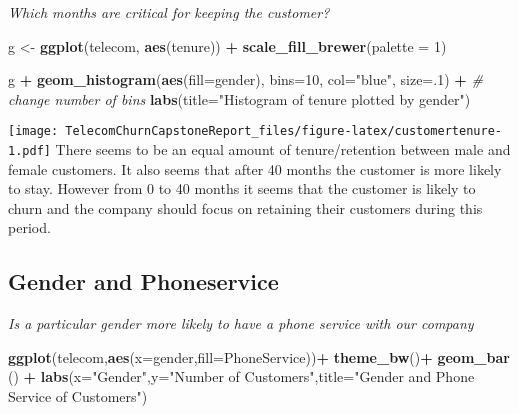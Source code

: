 \documentclass[]{article}
\newenvironment{Shaded}{\begin{snugshade}}{\end{snugshade}}
\newcommand{\KeywordTok}[1]{\textcolor[rgb]{0.13,0.29,0.53}{\textbf{#1}}}
\newcommand{\DataTypeTok}[1]{\textcolor[rgb]{0.13,0.29,0.53}{#1}}
\newcommand{\DecValTok}[1]{\textcolor[rgb]{0.00,0.00,0.81}{#1}}
\newcommand{\StringTok}[1]{\textcolor[rgb]{0.31,0.60,0.02}{#1}}
\newcommand{\CommentTok}[1]{\textcolor[rgb]{0.56,0.35,0.01}{\textit{#1}}}
\newcommand{\OperatorTok}[1]{\textcolor[rgb]{0.81,0.36,0.00}{\textbf{#1}}}
\newcommand{\NormalTok}[1]{#1}
\begin{document}
\emph{Which months are critical for keeping the customer?}

\begin{Shaded}
\begin{Highlighting}[]
\NormalTok{g <-}\StringTok{ }\KeywordTok{ggplot}\NormalTok{(telecom, }\KeywordTok{aes}\NormalTok{(tenure)) }\OperatorTok{+}\StringTok{ }\KeywordTok{scale_fill_brewer}\NormalTok{(}\DataTypeTok{palette =} \DecValTok{1}\NormalTok{)}


\NormalTok{g }\OperatorTok{+}\StringTok{ }\KeywordTok{geom_histogram}\NormalTok{(}\KeywordTok{aes}\NormalTok{(}\DataTypeTok{fill=}\NormalTok{gender), }
                   \DataTypeTok{bins=}\DecValTok{10}\NormalTok{, }
                   \DataTypeTok{col=}\StringTok{"blue"}\NormalTok{, }
                   \DataTypeTok{size=}\NormalTok{.}\DecValTok{1}\NormalTok{) }\OperatorTok{+}\StringTok{   }\CommentTok{# change number of bins}
\StringTok{  }\KeywordTok{labs}\NormalTok{(}\DataTypeTok{title=}\StringTok{"Histogram of tenure plotted by gender"}\NormalTok{) }
\end{Highlighting}
\end{Shaded}

\texttt{[image: TelecomChurnCapstoneReport\_files/figure-latex/customertenure-1.pdf]}
There seems to be an equal amount of tenure/retention between male and
female customers. It also seems that after 40 months the customer is
more likely to stay. However from 0 to 40 months it seems that the
customer is likely to churn and the company should focus on retaining
their customers during this period.

\subsection{Gender and Phoneservice}\label{gender-and-phoneservice}

\emph{Is a particular gender more likely to have a phone service with
our company}

\begin{Shaded}
\begin{Highlighting}[]
\KeywordTok{ggplot}\NormalTok{(telecom,}\KeywordTok{aes}\NormalTok{(}\DataTypeTok{x=}\NormalTok{gender,}\DataTypeTok{fill=}\NormalTok{PhoneService))}\OperatorTok{+}
\StringTok{  }\KeywordTok{theme_bw}\NormalTok{()}\OperatorTok{+}
\StringTok{  }\KeywordTok{geom_bar}\NormalTok{ () }\OperatorTok{+}
\StringTok{  }\KeywordTok{labs}\NormalTok{(}\DataTypeTok{x=}\StringTok{"Gender"}\NormalTok{,}\DataTypeTok{y=}\StringTok{"Number of Customers"}\NormalTok{,}\DataTypeTok{title=}\StringTok{"Gender and Phone Service of Customers"}\NormalTok{)}
\end{Highlighting}
\end{Shaded}
\end{document}
